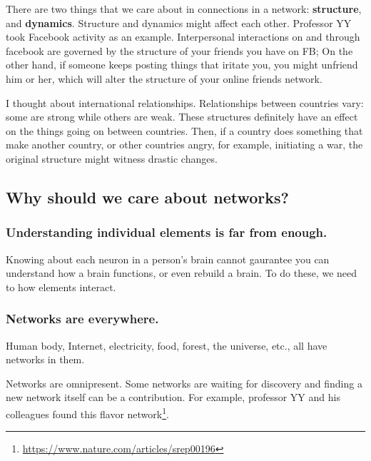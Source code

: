 \documentclass[
]{krantz}
\renewcommand{\href}[2]{#2\footnote{\url{#1}}}
\begin{document}
There are two things that we care about in connections in a network: \textbf{structure}, and \textbf{dynamics}. Structure and dynamics might affect each other. Professor YY took Facebook activity as an example. Interpersonal interactions on and through facebook are governed by the structure of your friends you have on FB; On the other hand, if someone keeps posting things that iritate you, you might unfriend him or her, which will alter the structure of your online friends network.

I thought about international relationships. Relationships between countries vary: some are strong while others are weak. These structures definitely have an effect on the things going on between countries. Then, if a country does something that make another country, or other countries angry, for example, initiating a war, the original structure might witness drastic changes.

\hypertarget{why-should-we-care-about-networks}{%
\subsection{Why should we care about networks?}\label{why-should-we-care-about-networks}}

\hypertarget{understanding-individual-elements-is-far-from-enough.}{%
\subsubsection{Understanding individual elements is far from enough.}\label{understanding-individual-elements-is-far-from-enough.}}

Knowing about each neuron in a person's brain cannot gaurantee you can understand how a brain functions, or even rebuild a brain. To do these, we need to how elements interact.

\hypertarget{networks-are-everywhere.}{%
\subsubsection{Networks are everywhere.}\label{networks-are-everywhere.}}

Human body, Internet, electricity, food, forest, the universe, etc., all have networks in them.

Networks are omnipresent. Some networks are waiting for discovery and finding a new network itself can be a contribution. For example, professor YY and his colleagues found this \href{https://www.nature.com/articles/srep00196}{flavor network}.
\end{document}
